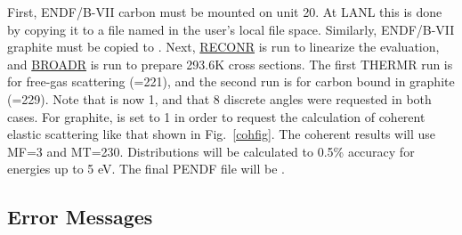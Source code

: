 \noindent
First, ENDF/B-VII carbon must be mounted on unit 20.  At LANL
this is done by copying it to a file named  in the
user's local file space.  Similarly,  ENDF/B-VII graphite must be copied
to .  Next, \hyperlink{sRECONRhy}{RECONR} is run
to linearize the evaluation, and \hyperlink{sBROADRhy}{BROADR}
is run to prepare 293.6K cross sections.  The first THERMR
run is for free-gas scattering (=221), and the second run
is for carbon bound in graphite (=229).  Note that
 is now 1, and that 8 discrete angles were requested
in both cases.   For graphite,  is set to 1 in order to
request the calculation of coherent elastic scattering like that shown
in Fig.~\ref{cohfig}.  The coherent results will use MF=3 and MT=230.
Distributions will be calculated to 0.5\% accuracy for energies up
to 5 eV.  The final PENDF file will be .

\subsection{Error Messages}
\label{ssTHERMR_msg}

